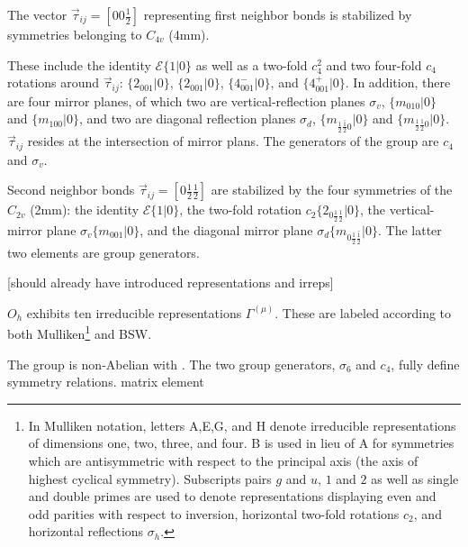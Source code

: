 \documentclass[twocolumn,showpacs,preprintnumbers,superscriptaddress,prb,floatfix,aps,10pt]{revtex4-1}
\newcommand*{\id}{\mathcal{E}}
\newcommand*{\bondvec}{\vec{\tau}_{ij}}
\newcommand{\seitz}[2]{\{#1|#2\}}
\begin{document}


The vector $\bondvec = [00\frac{1}{2}]$ representing first neighbor bonds is stabilized by symmetries belonging to $C_{4v}$ (4mm). 

These include the identity $\id \seitz{1}{0}$ as well as a two-fold $c_{4}^2$ and two four-fold $c_{4}$ rotations around $\bondvec$: $\seitz{2_{001}}{0}$, $\seitz{2_{001}}{0}$, $\seitz{4^-_{001}}{0}$, and $\seitz{4^+_{001}}{0}$. In addition, there are four mirror planes, of which two are vertical-reflection planes $\sigma_v$, $\seitz{m_{010}}{0}$ and $\seitz{m_{100}}{0}$, 
and two are diagonal reflection planes $\sigma_d$, $\seitz{m_{\frac{1}{2}\bar{\frac{1}{2}}0}}{0}$ and $\seitz{m_{\frac{1}{2}\frac{1}{2}0}}{0}$. $\bondvec$ resides at the intersection of mirror plans. The generators of the group are $c_4$ and $\sigma_v$.

Second neighbor bonds $\bondvec = [0\frac{1}{2}\frac{1}{2}]$ are stabilized by the four symmetries of the $C_{2v}$ (2mm): the identity $\id \seitz{1}{0}$, the two-fold rotation $c_2 \seitz{ 2_{0\frac{1}{2}\frac{1}{2}} }{0}$, the vertical-mirror plane $\sigma_v \seitz{m_{001}}{0}$, and the diagonal mirror plane $\sigma_d \seitz{m_{0\frac{1}{2}\bar{\frac{1}{2}}}}{0}$. The latter two elements are group generators.

[should already have introduced representations and irreps]

$O_h$ exhibits ten irreducible representations $\Gamma^{(\mu)}$. These are labeled according to both Mulliken\footnote{In Mulliken notation, letters A,E,G, and H denote irreducible representations of dimensions one, two, three, and four. B is used in lieu of A for symmetries which are antisymmetric with respect to the principal axis (the axis of highest cyclical symmetry). Subscripts pairs $g$ and $u$, $1$ and $2$ as well as single and double primes are used to denote representations displaying even and odd parities with respect to inversion, horizontal two-fold rotations $c_2$, and horizontal reflections $\sigma_h$.} and BSW.


The group is non-Abelian with . The two group generators, $\sigma_6$ and $c_4$, fully define symmetry relations.
matrix element 
\end{document}
